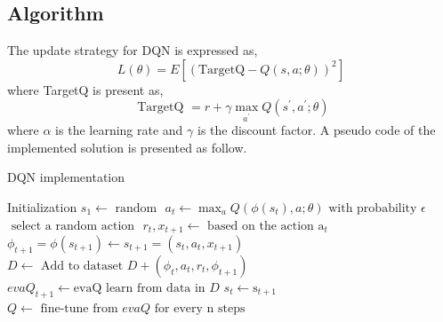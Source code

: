 \documentclass{IEEEtran}
\begin{document}
\subsection{Algorithm}
The update strategy for DQN is expressed as,
\begin{equation}
L(\theta)=E\left[(\text {TargetQ}-Q(s, a ; \theta))^{2}\right]
\end{equation}
where TargetQ is present as,
\begin{equation}
\text { TargetQ }=r+\gamma \max _{a^{\prime}} Q\left(s^{\prime}, a^{\prime} ; \theta\right)
\end{equation}
where $\alpha$ is the learning rate and $\gamma$ is the discount factor.
A pseudo code of the implemented solution is presented as follow.
\begin{algorithm}
	\caption{DQN implementation}
	\label{alg2}
	\begin{algorithmic}[1]
		\STATE Initialization
    \STATE $s_{1} \leftarrow \text { random }$
    \STATE $ a_{t}\leftarrow \max _{a} Q\left(\phi\left(s_{t}\right), a ; \theta\right)\text { with probability } \epsilon $
		\STATE $\text { select a random action } $
    \STATE $ r_{t}, x_{t+1} \leftarrow \text { based on the action } \mathrm{a}_{t}$
		\STATE $\phi_{t+1}=\phi\left(s_{t+1}\right)\leftarrow s_{t+1}=\left(s_{t}, a_{t}, x_{t+1}\right)$
		\STATE $D \leftarrow \text { Add to dataset } D+\left(\phi_{t}, a_{t}, r_{t}, \phi_{t+1}\right)$
    \STATE $ eva Q_{t+1} \leftarrow \text {evaQ learn from data in } D$
    \STATE $s_{t} \leftarrow \mathrm{s}_{t+1} $
    \ENDFOR
		\STATE $ Q \leftarrow \text{ fine-tune from }  evaQ \text{ for every n steps} $
		\ENDFOR
		\ENDFOR
	\end{algorithmic}
\end{algorithm}
\end{document}

